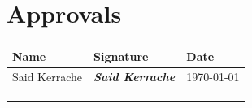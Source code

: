 \chapter*{Approvals}

\vfill
\begin{center}
	\begin{tabular}{p{5cm}p{5cm}p{3cm}}
		\toprule
		\textbf{Name} & \textbf{Signature} & \textbf{Date}\\ \midrule
		Said Kerrache &  \textit{\textbf{\calligra Said Kerrache}}& \today\\\midrule
		&&\\\midrule
		&&\\\midrule
		&&\\
		\bottomrule
	\end{tabular}
\end{center}
\vfill